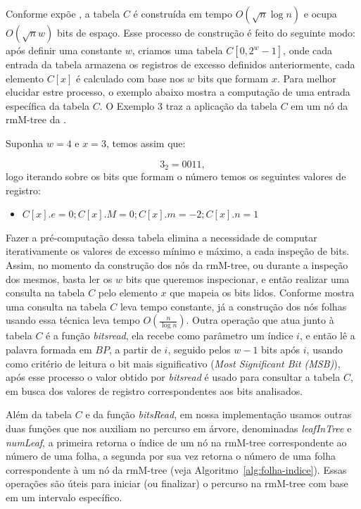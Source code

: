 Conforme expõe \citet{book-compact-data-structures}, a tabela $C$ é construída em tempo $O(\sqrt{n} \log n)$ e ocupa $O(\sqrt{n} w)$ bits de espaço. Esse processo de construção é feito do seguinte modo: após definir uma constante $w$, criamos uma tabela $C[0, 2^w-1]$,  onde cada entrada da tabela armazena os registros de excesso definidos anteriormente, cada elemento $C[x]$ é calculado com base nos $w$ bits  que formam $x$. Para melhor elucidar estre processo, o exemplo abaixo mostra a computação de uma entrada específica da tabela $C$. O Exemplo 3 traz a aplicação da tabela $C$ em um nó da rmM-tree da .
\begin{example}
    Suponha $w=4$ e $x=3$, temos assim que:

    $$3_2 = 0011,$$  logo iterando sobre os bits que formam o número temos os seguintes valores de  registro:
    \begin{itemize}
        \item $C[x].e = 0; C[x].M = 0; C[x].m = -2; C[x].n = 1$
    \end{itemize}
\end{example}

Fazer a pré-computação dessa tabela elimina a necessidade de computar iterativamente os valores de excesso mínimo e máximo, a cada inspeção de bits. Assim, no momento da construção dos nós da rmM-tree, ou durante a inspeção dos mesmos, basta ler os $w$ bits que queremos inspecionar, e então realizar uma consulta na tabela $C$ pelo elemento $x$ que mapeia os bits lidos. Conforme mostra \citet{book-compact-data-structures} uma consulta na tabela $C$ leva tempo constante, já a construção dos nós folhas usando essa técnica leva tempo $O(\frac{n}{\log n})$. Outra operação que atua junto à tabela $C$ é a função \textit{bitsread}, ela recebe como parâmetro um índice $i$, e então lê a palavra formada em $BP$, a partir de $i$, seguido pelos $w-1$ bits após $i$, usando como critério de leitura o bit mais significativo (\textit{Most Significant Bit (MSB)}), após esse processo o valor obtido por \textit{bitsread} é usado para consultar a tabela $C$, em busca dos valores de registro correspondentes aos bits analisados. 

Além da tabela $C$ e da função \textit{bitsRead}, em nossa implementação usamos outras duas funções que nos auxiliam no  percurso em árvore, denominadas \textit{leafInTree} e \textit{numLeaf}, a primeira retorna o índice de um nó na rmM-tree correspondente ao número de uma folha,  a segunda por sua vez retorna o número de uma folha correspondente à um nó da rmM-tree (veja Algoritmo~\ref{alg:folha-indice}). Essas operações são úteis para iniciar (ou finalizar) o percurso na rmM-tree com base em um intervalo específico.


